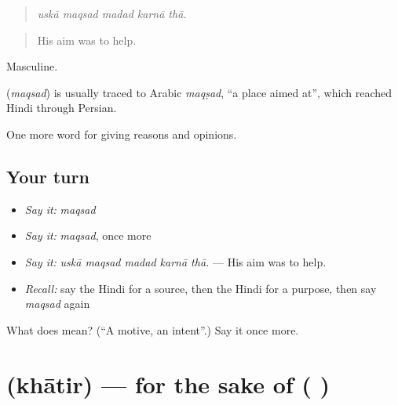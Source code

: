 \begin{quote}
    
\end{quote}

\begin{quote}
\emph{uskā maqsad madad karnā thā.}
\end{quote}

\begin{quote}
His aim was to help.
\end{quote}

Masculine.

\begin{cousinweb}
\textbf{} (\emph{maqsad}) is usually traced to Arabic \emph{maqṣad}, \textquotedblleft{}a place aimed at\textquotedblright{}, which reached Hindi through Persian.
\end{cousinweb}

\begin{grammarlens}[title={What you've built}]
One more word for giving reasons and opinions.
\end{grammarlens}

\subsection*{Your turn}
\begin{itemize}
\raggedright
  \item \emph{Say it:} \emph{maqsad}
  \item \emph{Say it:} \emph{maqsad}, once more
  \item \emph{Say it:} \emph{uskā maqsad madad karnā thā.} — His aim was to help.
  \item \emph{Recall:} say the Hindi for a source, then the Hindi for a purpose, then say \emph{maqsad} again
\end{itemize}

\begin{tcolorbox}[breakable,colback=teal!4,colframe=teal!35!black,title={Before you move on}]
What does  mean? (\textquotedblleft{}A motive, an intent\textquotedblright{}.) Say it once more.
\end{tcolorbox}
\section[\texorpdfstring{\hi{ख़ातिर} (khātir)}{ख़ातिर (khātir)}]{ (khātir) — for the sake of ( )}

\label{lesson:HI-C345-khatir}



